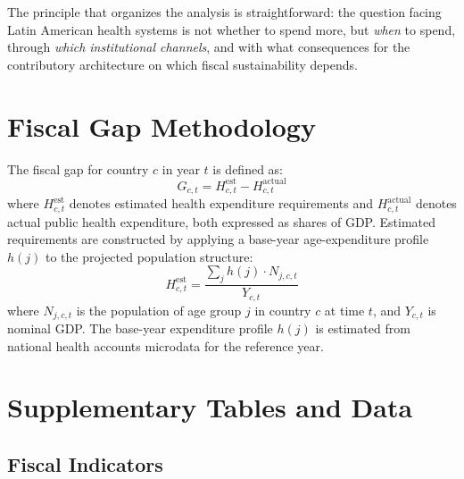 \documentclass[12pt,a4paper]{article}
\begin{document}
The principle that organizes the analysis is straightforward: the question facing Latin American health systems is not whether to spend more, but \textit{when} to spend, through \textit{which institutional channels}, and with what consequences for the contributory architecture on which fiscal sustainability depends.


\begin{appendices}

\section{Fiscal Gap Methodology}
\label{app:fiscal_gap}

The fiscal gap for country $c$ in year $t$ is defined as:
\begin{equation}
\label{eq:fiscal_gap}
G_{c,t} = H_{c,t}^{\text{est}} - H_{c,t}^{\text{actual}}
\end{equation}
where $H_{c,t}^{\text{est}}$ denotes estimated health expenditure requirements and $H_{c,t}^{\text{actual}}$ denotes actual public health expenditure, both expressed as shares of GDP. Estimated requirements are constructed by applying a base-year age-expenditure profile $h(j)$ to the projected population structure:
\begin{equation}
\label{eq:fiscal_gap_est}
H_{c,t}^{\text{est}} = \frac{\sum_j h(j) \cdot N_{j,c,t}}{Y_{c,t}}
\end{equation}
where $N_{j,c,t}$ is the population of age group $j$ in country $c$ at time $t$, and $Y_{c,t}$ is nominal GDP. The base-year expenditure profile $h(j)$ is estimated from national health accounts microdata for the reference year.


\section{Supplementary Tables and Data}
\label{app:supplementary}

\subsection{Fiscal Indicators}
\label{app:fiscal_table}


\end{appendices}
\end{document}
